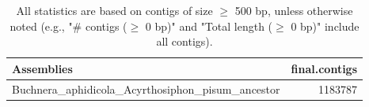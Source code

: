\documentclass[12pt,a4paper]{article}
\begin{document}
\begin{table}[ht]
\begin{center}
\caption{All statistics are based on contigs of size $\geq$ 500 bp, unless otherwise noted (e.g., "\# contigs ($\geq$ 0 bp)" and "Total length ($\geq$ 0 bp)" include all contigs).}
\begin{tabular}{|l*{1}{|r}|}
\hline
Assemblies & final.contigs \\ \hline
Buchnera\_aphidicola\_Acyrthosiphon\_pisum\_ancestor & 1183787 \\ \hline
\end{tabular}
\end{center}
\end{table}
\end{document}
